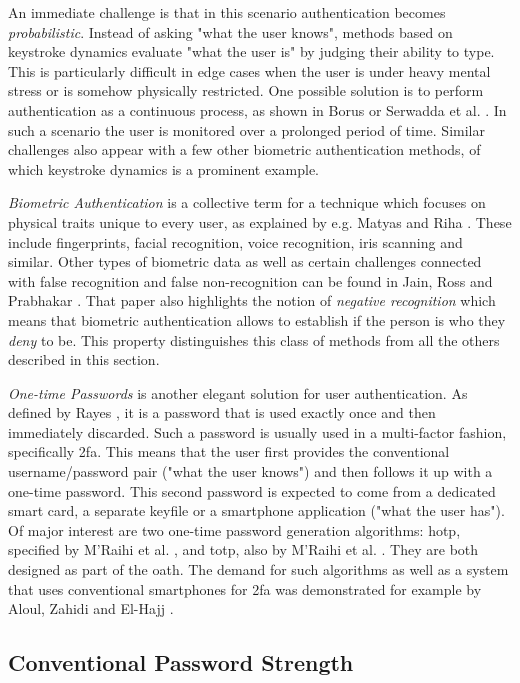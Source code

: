 An immediate challenge is that in this scenario authentication becomes \emph{probabilistic}. Instead of asking "what the user knows", methods based on keystroke dynamics evaluate "what the user is" by judging their ability to type. This is particularly difficult in edge cases when the user is under heavy mental stress or is somehow physically restricted. One possible solution is to perform authentication as a continuous process, as shown in Borus \cite{bours2012continuous} or Serwadda et al. \cite{serwadda2013scan}. In such a scenario the user is monitored over a prolonged period of time. Similar challenges also appear with a few other biometric authentication methods, of which keystroke dynamics is a prominent example.

\emph{Biometric Authentication} is a collective term for a technique which focuses on physical traits unique to every user, as explained by e.g. Matyas and Riha \cite{matyas:2003:toward}. These include fingerprints, facial recognition, voice recognition, iris scanning and similar. Other types of biometric data as well as certain challenges connected with false recognition and false non-recognition can be found in Jain, Ross and Prabhakar \cite{jain:2004:intro-to-biometric}. That paper also highlights the notion of \emph{negative recognition} which means that biometric authentication allows to establish if the person is who they \emph{deny} to be. This property distinguishes this class of methods from all the others described in this section.

\emph{One-time Passwords} is another elegant solution for user authentication. As defined by Rayes \cite{rayes:2005:otp}, it is a password that is used exactly once and then immediately discarded. Such a password is usually used in a multi-factor fashion, specifically \gls{2fa}. This means that the user first provides the conventional username/password pair ("what the user knows") and then follows it up with a one-time password. This second password is expected to come from a dedicated smart card, a separate keyfile or a smartphone application ("what the user has"). Of major interest are two one-time password generation algorithms: \gls{hotp}, specified by M’Raihi et al. \cite{rfc4226}, and \gls{totp}, also by M’Raihi et al. \cite{rfc6238}. They are both designed as part of the \gls{oath}. The demand for such algorithms as well as a system that uses conventional smartphones for \gls{2fa} was demonstrated for example by
Aloul, Zahidi and El-Hajj \cite{aloul:2009:two-factor-auth}.

\subsection{Conventional Password Strength}
\label{sec:password-strength}

